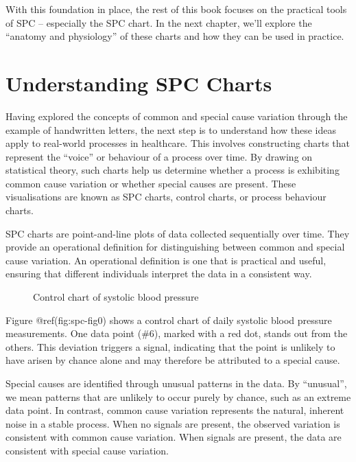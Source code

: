 \documentclass[
]{book}
\makeatletter
\newcommand*\pandocbounded[1]{%
  \sbox\pandoc@box{#1}%
  \Gscale@div\@tempa{\textheight}{\dimexpr\ht\pandoc@box+\dp\pandoc@box\relax}%
  \Gscale@div\@tempb{\linewidth}{\wd\pandoc@box}%
  \ifdim\@tempb\p@<\@tempa\p@\let\@tempa\@tempb\fi%
  \ifdim\@tempa\p@<\p@\scalebox{\@tempa}{\usebox\pandoc@box}%
  \else\usebox{\pandoc@box}%
  \fi%
}
\makeatother
\begin{document}
With this foundation in place, the rest of this book focuses on the
practical tools of SPC -- especially the SPC chart. In the next chapter,
we'll explore the ``anatomy and physiology'' of these charts and how
they can be used in practice.

\chapter{Understanding SPC Charts}\label{charts-intro}

Having explored the concepts of common and special cause variation
through the example of handwritten letters, the next step is to
understand how these ideas apply to real-world processes in healthcare.
This involves constructing charts that represent the ``voice'' or
behaviour of a process over time. By drawing on statistical theory, such
charts help us determine whether a process is exhibiting common cause
variation or whether special causes are present. These visualisations
are known as SPC charts, control charts, or process behaviour charts.

SPC charts are point-and-line plots of data collected sequentially over
time. They provide an operational definition for distinguishing between
common and special cause variation. An operational definition is one
that is practical and useful, ensuring that different individuals
interpret the data in a consistent way.

\begin{figure}
\centering
\pandocbounded{}
\caption{Control chart of systolic blood pressure}
\end{figure}

Figure @ref(fig:spc-fig0) shows a control chart of daily systolic blood
pressure measurements. One data point (\#6), marked with a red dot,
stands out from the others. This deviation triggers a signal, indicating
that the point is unlikely to have arisen by chance alone and may
therefore be attributed to a special cause.

Special causes are identified through unusual patterns in the data. By
``unusual'', we mean patterns that are unlikely to occur purely by
chance, such as an extreme data point. In contrast, common cause
variation represents the natural, inherent noise in a stable process.
When no signals are present, the observed variation is consistent with
common cause variation. When signals are present, the data are
consistent with special cause variation.
\end{document}
